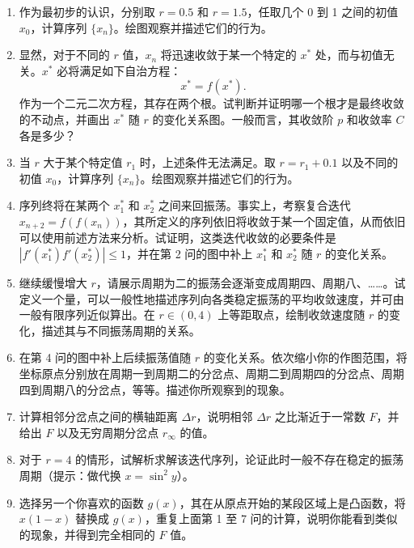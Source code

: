 \begin{enumerate}
\item 作为最初步的认识，分别取 $r=0.5$ 和 $r=1.5$，任取几个 0 到 1 之间的初值 $x_0$，计算序列 $\{x_n\}$。绘图观察并描述它们的行为。
\item 显然，对于不同的 $r$ 值，$x_n$ 将迅速收敛于某一个特定的 $x^*$ 处，而与初值无关。$x^*$ 必将满足如下自治方程：
\begin{equation}
 x^*=f(x^*).
\tag{2}
\end{equation}
作为一个二元二次方程，其存在两个根。试判断并证明哪一个根才是最终收敛的不动点，并画出 $x^*$ 随 $r$ 的变化关系图。一般而言，其收敛阶 $p$ 和收敛率 $C$ 各是多少？
\item 当 $r$ 大于某个特定值 $r_1$ 时，上述条件无法满足。取 $r=r_1+0.1$ 以及不同的初值 $x_0$，计算序列 $\{x_n\}$。绘图观察并描述它们的行为。
\item 序列终将在某两个 $x_1^*$ 和 $x_2^*$ 之间来回振荡。事实上，考察复合迭代 $x_{n+2}=f(f(x_n))$，其所定义的序列依旧将收敛于某一个固定值，从而依旧可以使用前述方法来分析。试证明，这类迭代收敛的必要条件是 $|f'(x_1^*)f'(x_2^*)|\le1$，并在第 2 问的图中补上 $x_1^*$ 和 $x_2^*$ 随 $r$ 的变化关系。
\item 继续缓慢增大 $r$，请展示周期为二的振荡会逐渐变成周期四、周期八、……。试定义一个量，可以一般性地描述序列向各类稳定振荡的平均收敛速度，并可由一般有限序列近似算出。在 $r\in(0,4)$ 上等距取点，绘制收敛速度随 $r$ 的变化，描述其与不同振荡周期的关系。
\item 在第 4 问的图中补上后续振荡值随 $r$ 的变化关系。依次缩小你的作图范围，将坐标原点分别放在周期一到周期二的分岔点、周期二到周期四的分岔点、周期四到周期八的分岔点，等等。描述你所观察到的现象。
\item 计算相邻分岔点之间的横轴距离 $\Delta r$，说明相邻 $\Delta r$ 之比渐近于一常数 $F$，并给出 $F$ 以及无穷周期分岔点 $r_\infty$ 的值。
\item 对于 $r=4$ 的情形，试解析求解该迭代序列，论证此时一般不存在稳定的振荡周期（提示：做代换 $x=\sin^2 y$）。
\item 选择另一个你喜欢的函数 $g(x)$，其在从原点开始的某段区域上是凸函数，将 $x(1-x)$ 替换成 $g(x)$，重复上面第 1 至 7 问的计算，说明你能看到类似的现象，并得到完全相同的 $F$ 值。
\end{enumerate}

